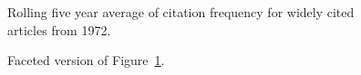 \documentclass[
  10pt,
  letterpaper,
  DIV=11,
  numbers=noendperiod,
  twoside]{scrartcl}
\begin{document}
\begin{figure}


\caption{\label{fig-citation-spaghetti-1972}Rolling five year average of
citation frequency for widely cited articles from 1972.}

\end{figure}%

\begin{figure}


\caption{\label{fig-citation-facet-1972}Faceted version of
Figure~\ref{fig-citation-spaghetti-1972}.}

\end{figure}%
\end{document}

